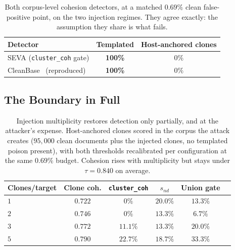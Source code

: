 \documentclass[10pt,journal,compsoc]{IEEEtran}
\begin{document}
\begin{table}[t]
\centering
\caption{Both corpus-level cohesion detectors, at a matched $0.69\%$ clean false-positive point,
on the two injection regimes. They agree exactly: the assumption they share is what fails.}
\label{tab:boundary}
\begin{tabular}{lcc}
\toprule
Detector & Templated & Host-anchored clones \\
\midrule
SEVA (\texttt{cluster\_coh} gate) & \textbf{100\%} & $0\%$ \\
CleanBase~\cite{cleanbase} (reproduced) & \textbf{100\%} & $0\%$ \\
\bottomrule
\end{tabular}
\end{table}

\subsection{The Boundary in Full}
\label{app:boundaryfull}
\begin{table}[H]
\centering
\caption{Injection multiplicity restores detection only partially, and at the attacker's expense. Host-anchored clones scored in the
corpus the attack creates ($95{,}000$ clean documents plus the injected clones, no templated
poison present), with both thresholds recalibrated per configuration at the same $0.69\%$
budget. Cohesion rises with multiplicity but stays under $\tau=0.840$ on average.}
\label{tab:multiplicity}
\begin{tabular}{lccccc}
\toprule
Clones/target & Clone coh. & \texttt{cluster\_coh} & $s_{nd}$ & Union gate \\
\midrule
$1$ & $0.722$ & $0\%$    & $20.0\%$ & $13.3\%$ \\
$2$ & $0.746$ & $0\%$    & $13.3\%$ & $6.7\%$  \\
$3$ & $0.772$ & $11.1\%$ & $13.3\%$ & $20.0\%$ \\
$5$ & $0.790$ & $22.7\%$ & $18.7\%$ & $33.3\%$ \\
\bottomrule
\end{tabular}
\end{table}
\end{document}
